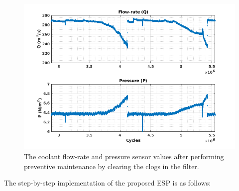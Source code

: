 \documentclass[conference]{IEEEtran}
\begin{document}
\begin{figure}[htbp]
\centerline{\includegraphics[width=\linewidth]{Sensor_values.png}}
\caption{The coolant flow-rate and pressure sensor values after performing preventive maintenance by clearing the clogs in the filter.}
\label{fig:Sensor_values}
\end{figure}

The step-by-step implementation of the proposed ESP is as follows:
\end{document}
